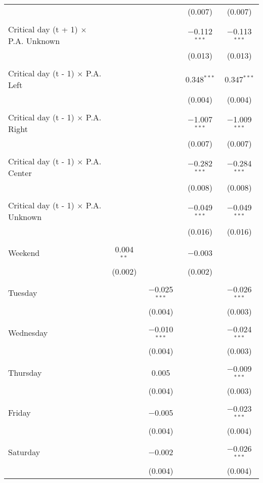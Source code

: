 \documentclass[
]{article}
\begin{document}
\begin{table}[!htbp]
{\begin{tabular}{@{\extracolsep{5pt}}lcccc}
  &  &  & (0.007) & (0.007) \\ 
  & & & & \\ 
 Critical day (t + 1) $\times$ P.A. Unknown &  &  & $-$0.112$^{***}$ & $-$0.113$^{***}$ \\ 
  &  &  & (0.013) & (0.013) \\ 
  & & & & \\ 
 Critical day (t - 1) $\times$ P.A. Left &  &  & 0.348$^{***}$ & 0.347$^{***}$ \\ 
  &  &  & (0.004) & (0.004) \\ 
  & & & & \\ 
 Critical day (t - 1) $\times$ P.A. Right &  &  & $-$1.007$^{***}$ & $-$1.009$^{***}$ \\ 
  &  &  & (0.007) & (0.007) \\ 
  & & & & \\ 
 Critical day (t - 1) $\times$ P.A. Center &  &  & $-$0.282$^{***}$ & $-$0.284$^{***}$ \\ 
  &  &  & (0.008) & (0.008) \\ 
  & & & & \\ 
 Critical day (t - 1) $\times$ P.A. Unknown &  &  & $-$0.049$^{***}$ & $-$0.049$^{***}$ \\ 
  &  &  & (0.016) & (0.016) \\ 
  & & & & \\ 
 Weekend & 0.004$^{**}$ &  & $-$0.003 &  \\ 
  & (0.002) &  & (0.002) &  \\ 
  & & & & \\ 
 Tuesday &  & $-$0.025$^{***}$ &  & $-$0.026$^{***}$ \\ 
  &  & (0.004) &  & (0.003) \\ 
  & & & & \\ 
 Wednesday &  & $-$0.010$^{***}$ &  & $-$0.024$^{***}$ \\ 
  &  & (0.004) &  & (0.003) \\ 
  & & & & \\ 
 Thursday &  & 0.005 &  & $-$0.009$^{***}$ \\ 
  &  & (0.004) &  & (0.003) \\ 
  & & & & \\ 
 Friday &  & $-$0.005 &  & $-$0.023$^{***}$ \\ 
  &  & (0.004) &  & (0.004) \\ 
  & & & & \\ 
 Saturday &  & $-$0.002 &  & $-$0.026$^{***}$ \\ 
  &  & (0.004) &  & (0.004) \\ 

\end{tabular}}
\end{table}
\end{document}
